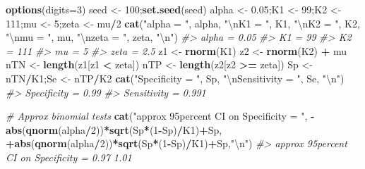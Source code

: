 \documentclass[
]{book}
\newenvironment{Shaded}{\begin{snugshade}}{\end{snugshade}}
\newcommand{\CharTok}[1]{\textcolor[rgb]{0.31,0.60,0.02}{#1}}
\newcommand{\CommentTok}[1]{\textcolor[rgb]{0.56,0.35,0.01}{\textit{#1}}}
\newcommand{\DataTypeTok}[1]{\textcolor[rgb]{0.13,0.29,0.53}{#1}}
\newcommand{\DecValTok}[1]{\textcolor[rgb]{0.00,0.00,0.81}{#1}}
\newcommand{\FloatTok}[1]{\textcolor[rgb]{0.00,0.00,0.81}{#1}}
\newcommand{\KeywordTok}[1]{\textcolor[rgb]{0.13,0.29,0.53}{\textbf{#1}}}
\newcommand{\NormalTok}[1]{#1}
\newcommand{\OperatorTok}[1]{\textcolor[rgb]{0.81,0.36,0.00}{\textbf{#1}}}
\newcommand{\StringTok}[1]{\textcolor[rgb]{0.31,0.60,0.02}{#1}}
\begin{document}
\begin{Shaded}
\begin{Highlighting}[]
\KeywordTok{options}\NormalTok{(}\DataTypeTok{digits=}\DecValTok{3}\NormalTok{)}
\NormalTok{seed <-}\StringTok{ }\DecValTok{100}\NormalTok{;}\KeywordTok{set.seed}\NormalTok{(seed)}
\NormalTok{alpha <-}\StringTok{ }\FloatTok{0.05}\NormalTok{;K1 <-}\StringTok{ }\DecValTok{99}\NormalTok{;K2 <-}\StringTok{ }\DecValTok{111}\NormalTok{;mu <-}\StringTok{ }\DecValTok{5}\NormalTok{;zeta <-}\StringTok{ }\NormalTok{mu}\OperatorTok{/}\DecValTok{2}
\KeywordTok{cat}\NormalTok{(}\StringTok{"alpha = "}\NormalTok{, alpha, }
    \StringTok{"}\CharTok{\textbackslash{}n}\StringTok{K1 = "}\NormalTok{, K1, }
    \StringTok{"}\CharTok{\textbackslash{}n}\StringTok{K2 = "}\NormalTok{, K2, }
    \StringTok{"}\CharTok{\textbackslash{}n}\StringTok{mu = "}\NormalTok{, mu, }
    \StringTok{"}\CharTok{\textbackslash{}n}\StringTok{zeta = "}\NormalTok{, zeta, }\StringTok{"}\CharTok{\textbackslash{}n}\StringTok{"}\NormalTok{)}
\CommentTok{#> alpha =  0.05 }
\CommentTok{#> K1 =  99 }
\CommentTok{#> K2 =  111 }
\CommentTok{#> mu =  5 }
\CommentTok{#> zeta =  2.5}
\NormalTok{z1 <-}\StringTok{ }\KeywordTok{rnorm}\NormalTok{(K1)}
\NormalTok{z2 <-}\StringTok{ }\KeywordTok{rnorm}\NormalTok{(K2) }\OperatorTok{+}\StringTok{ }\NormalTok{mu}
\NormalTok{nTN <-}\StringTok{ }\KeywordTok{length}\NormalTok{(z1[z1 }\OperatorTok{<}\StringTok{ }\NormalTok{zeta])}
\NormalTok{nTP <-}\StringTok{ }\KeywordTok{length}\NormalTok{(z2[z2 }\OperatorTok{>=}\StringTok{ }\NormalTok{zeta])}
\NormalTok{Sp <-}\StringTok{ }\NormalTok{nTN}\OperatorTok{/}\NormalTok{K1;Se <-}\StringTok{ }\NormalTok{nTP}\OperatorTok{/}\NormalTok{K2}
\KeywordTok{cat}\NormalTok{(}\StringTok{"Specificity = "}\NormalTok{, Sp, }
    \StringTok{"}\CharTok{\textbackslash{}n}\StringTok{Sensitivity = "}\NormalTok{, Se, }\StringTok{"}\CharTok{\textbackslash{}n}\StringTok{"}\NormalTok{)}
\CommentTok{#> Specificity =  0.99 }
\CommentTok{#> Sensitivity =  0.991}

\CommentTok{# Approx binomial tests}
\KeywordTok{cat}\NormalTok{(}\StringTok{"approx 95percent CI on Specificity = "}\NormalTok{, }
    \OperatorTok{-}\KeywordTok{abs}\NormalTok{(}\KeywordTok{qnorm}\NormalTok{(alpha}\OperatorTok{/}\DecValTok{2}\NormalTok{))}\OperatorTok{*}\KeywordTok{sqrt}\NormalTok{(Sp}\OperatorTok{*}\NormalTok{(}\DecValTok{1}\OperatorTok{-}\NormalTok{Sp)}\OperatorTok{/}\NormalTok{K1)}\OperatorTok{+}\NormalTok{Sp, }
    \OperatorTok{+}\KeywordTok{abs}\NormalTok{(}\KeywordTok{qnorm}\NormalTok{(alpha}\OperatorTok{/}\DecValTok{2}\NormalTok{))}\OperatorTok{*}\KeywordTok{sqrt}\NormalTok{(Sp}\OperatorTok{*}\NormalTok{(}\DecValTok{1}\OperatorTok{-}\NormalTok{Sp)}\OperatorTok{/}\NormalTok{K1)}\OperatorTok{+}\NormalTok{Sp,}\StringTok{"}\CharTok{\textbackslash{}n}\StringTok{"}\NormalTok{)}
\CommentTok{#> approx 95percent CI on Specificity =  0.97 1.01}


\end{Highlighting}
\end{Shaded}
\end{document}
